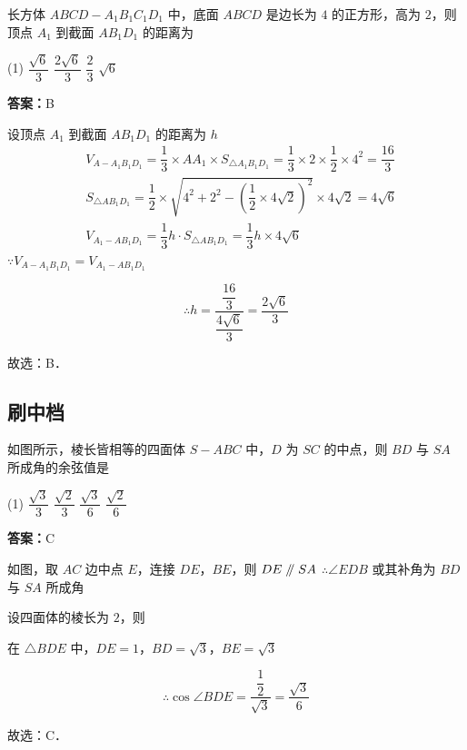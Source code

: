 \begin{example}[\bkstar{3}{5}]
长方体 $ABCD-A_1B_1C_1D_1$ 中，底面 $ABCD$ 是边长为 $4$ 的正方形，高为 $2$，则顶点 $A_1$ 到截面 $AB_1D_1$ 的距离为
\begin{tasks}(1)
    \task $\dfrac{\sqrt{6}}{3}$
    \task $\dfrac{2\sqrt{6}}{3}$
    \task $\dfrac{2}{3}$
    \task $\sqrt{6}$
\end{tasks}
\end{example}
\begin{solution}
\textbf{答案：}B

设顶点 $A_1$ 到截面 $AB_1D_1$ 的距离为 $h$
\begin{align*}
&V_{A-A_1B_1D_1}=\dfrac{1}{3}\times AA_1\times S_{\triangle A_1B_1D_1}=\dfrac{1}{3}\times 2\times\dfrac{1}{2}\times 4^2=\dfrac{16}{3}\\
&S_{\triangle AB_1D_1}=\dfrac{1}{2}\times\sqrt{4^2+2^2-\left(\dfrac{1}{2}\times 4\sqrt{2}\right)^2}\times 4\sqrt{2}=4\sqrt{6}\\
&V_{A_1-AB_1D_1}=\dfrac{1}{3}h\cdot S_{\triangle AB_1D_1}=\dfrac{1}{3}h\times 4\sqrt{6}
\end{align*}
$\because V_{A-A_1B_1D_1}=V_{A_1-AB_1D_1}$

$$
\therefore h=\dfrac{\dfrac{16}{3}}{\dfrac{4\sqrt{6}}{3}}=\dfrac{2\sqrt{6}}{3}
$$

故选：B．
\end{solution}

\vspace{2em}

\subsection{刷中档}

\begin{example}[\bkstar{3}{5}]
如图所示，棱长皆相等的四面体 $S-ABC$ 中，$D$ 为 $SC$ 的中点，则 $BD$ 与 $SA$ 所成角的余弦值是
\begin{tasks}(1)
    \task $\dfrac{\sqrt{3}}{3}$
    \task $\dfrac{\sqrt{2}}{3}$
    \task $\dfrac{\sqrt{3}}{6}$
    \task $\dfrac{\sqrt{2}}{6}$
\end{tasks}
\end{example}
\begin{solution}
\textbf{答案：}C

如图，取 $AC$ 边中点 $E$，连接 $DE$，$BE$，则 $DE\mathrel{/\mkern-5mu/} SA$
$\therefore \angle EDB$ 或其补角为 $BD$ 与 $SA$ 所成角

设四面体的棱长为 $2$，则

在 $\triangle BDE$ 中，$DE=1$，$BD=\sqrt{3}$，$BE=\sqrt{3}$

$$
\therefore \cos\angle BDE=\dfrac{\dfrac{1}{2}}{\sqrt{3}}=\dfrac{\sqrt{3}}{6}
$$

故选：C．
\end{solution}

